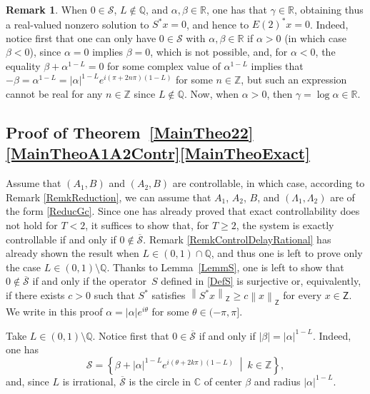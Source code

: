\documentclass[10pt]{amsart}
\theoremstyle{plain}
\theoremstyle{definition}
\newtheorem{remk}[theo]{Remark}
\newcommand{\midsuchthat}{\;\middle|\:}
\newcommand{\norm}[1]{\left\lVert #1\right\lVert}
\newcommand{\abs}[1]{\left\lvert #1\right \rvert}
\begin{document}
\begin{remk}
When $0 \in \mathcal S$, $L \notin \mathbb Q$, and $\alpha, \beta \in \mathbb R$, one has that $\gamma \in \mathbb R$, obtaining thus a real-valued nonzero solution to $S^\ast x = 0$, and hence to $E(2)^\ast x = 0$. Indeed, notice first that one can only have $0 \in \mathcal S$ with $\alpha, \beta \in \mathbb R$ if $\alpha > 0$ (in which case $\beta < 0$), since $\alpha = 0$ implies $\beta = 0$, which is not possible, and, for $\alpha < 0$, the equality $\beta + \alpha^{1 - L} = 0$ for some complex value of $\alpha^{1 - L}$ implies that $-\beta = \alpha^{1-L} = \abs{\alpha}^{1-L} e^{i (\pi + 2 n \pi)(1 - L)}$ for some $n \in \mathbb Z$, but such an expression cannot be real for any $n \in \mathbb Z$ since $L \notin \mathbb Q$. Now, when $\alpha > 0$, then $\gamma = \log\alpha \in \mathbb R$.
\end{remk}

\subsection{Proof of Theorem~\ref{MainTheo22}\eqref{MainTheoA1A2Contr}\eqref{MainTheoExact}}
Assume that $(A_1, B)$ and $(A_2, B)$ are controllable, in which case, according to Remark \ref{RemkReduction}, we can assume that $A_1$, $A_2$, $B$, and $(\Lambda_1, \Lambda_2)$ are of the form \eqref{ReducGc}. Since one has already proved that exact controllability does not hold for $T < 2$, it suffices to show that, for $T \geq 2$, the system is exactly controllable if and only if $0 \notin \overline{\mathcal S}$. Remark \ref{RemkControlDelayRational} has already shown the result when $L \in (0, 1) \cap \mathbb Q$, and thus one is left to prove only the case $L \in (0, 1) \setminus \mathbb Q$. Thanks to Lemma~\ref{LemmS}, one is left to show that $0 \notin \overline{\mathcal S}$ if and only if the operator~$S$ defined in \eqref{DefS} is surjective or, equivalently, if there exists $c > 0$ such that $S^\ast$ satisfies $\norm{S^\ast x}_{\mathsf Z} \geq c \norm{x}_{\mathsf Z}$ for every $x \in \mathsf Z$. We write in this proof $\alpha = \abs{\alpha} e^{i\theta}$ for some $\theta \in (-\pi, \pi]$.

Take $L \in (0, 1) \setminus \mathbb Q$. Notice first that $0 \in \overline{\mathcal S}$ if and only if $\abs{\beta} = \abs{\alpha}^{1-L}$. Indeed, one has
\[
\mathcal S = \left\{\beta + \abs{\alpha}^{1 - L} e^{i (\theta + 2 k \pi)\left(1 - L\right)} \midsuchthat k \in \mathbb Z\right\},
\]
and, since $L$ is irrational, $\overline{\mathcal S}$ is the circle in $\mathbb C$ of center $\beta$ and radius $\abs{\alpha}^{1-L}$.
\end{document}
